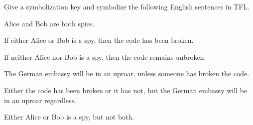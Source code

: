\begin{practiceproblems}
\problempart
\label{pr:spies}
Give a symbolization key and symbolize the following English sentences in TFL.
\begin{problemslist}
\item Alice and Bob are both spies.
\item If either Alice or Bob is a spy, then the code has been broken.
\item If neither Alice nor Bob is a spy, then the code remains unbroken.
\item The German embassy will be in an uproar, unless someone has broken the code.
\item Either the code has been broken or it has not, but the German embassy will be in an uproar regardless.
\item Either Alice or Bob is a spy, but not both.
\end{problemslist}



\end{practiceproblems}
